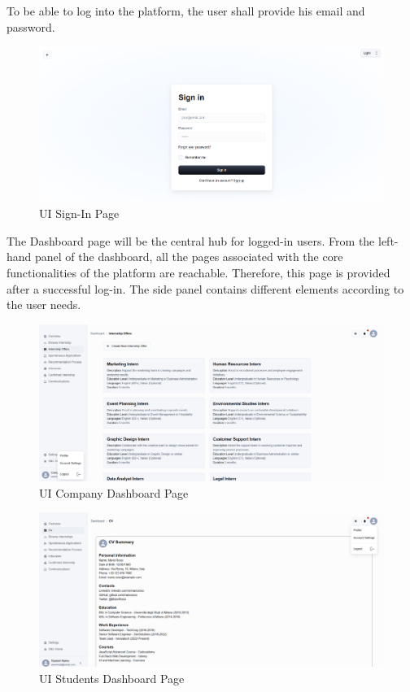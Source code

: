 To be able to log into the platform, the user shall provide his email and password. 
\begin{figure}[H]
    \centering
    \includegraphics[width=\textwidth]{Latex/Images/New Ui/SignInPage.png}
    \caption{UI Sign-In Page}
    \label{fig:signinpage}
\end{figure}
\noindent The Dashboard page will be the central hub for logged-in users. From the left-hand panel of the dashboard, all the pages associated with the core functionalities of the platform are reachable. Therefore, this page is provided after a successful log-in. The side panel contains different elements according to the user needs.
\begin{figure}[H]
    \centering
    \includegraphics[width=\textwidth]{Latex/Images/New Ui/Company-Dashboard.png}
    \caption{UI Company Dashboard Page}
    \label{fig:companyDashboard}
\end{figure}
\begin{figure}[H]
    \centering
    \includegraphics[width=\textwidth]{Latex/Images/New Ui/Student-Dashboard.png}
    \caption{UI Students Dashboard Page}
    \label{fig:studentDashboard}
\end{figure}
